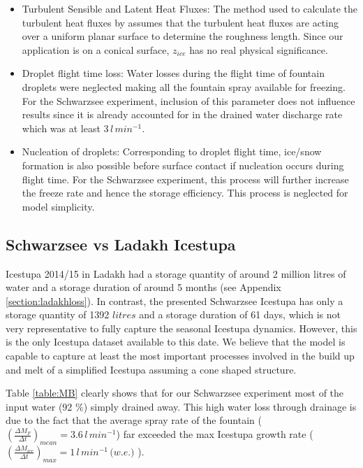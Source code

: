 \documentclass[utf8]{frontiersSCNS} %
\begin{document}
\begin{itemize}

\item  Turbulent Sensible and Latent Heat Fluxes: The method used to calculate the turbulent heat fluxes by
  \cite{Garratt_1992} assumes that the turbulent heat fluxes are acting over a uniform planar surface to determine the
  roughness length. Since our application is on a conical surface, $z_{ice}$ has no real physical significance.

\item Droplet flight time loss: Water losses during the flight time of fountain droplets were neglected making all the
  fountain spray available for freezing. For the Schwarzsee experiment, inclusion of this parameter does not influence
  results since it is already accounted for in the drained water discharge rate which was at least $3\, l\,min^{-1}$.

\item Nucleation of droplets: Corresponding to droplet flight time, ice/snow formation is also possible before surface
  contact if nucleation occurs during flight time. For the Schwarzsee experiment, this process will further increase the
  freeze rate and hence the storage efficiency. This process is neglected for model simplicity.

\end{itemize}

\subsection{Schwarzsee vs Ladakh Icestupa} Icestupa 2014/15 in Ladakh had a storage quantity of around 2 million litres
of water and a storage duration of around 5 months (see Appendix \ref{section:ladakhloss}). In contrast, the presented
Schwarzsee Icestupa has only a storage quantity of 1392 $litres$ and a storage duration of 61 days, which is not very
representative to fully capture the seasonal Icestupa dynamics. However, this is the only Icestupa dataset available to
this date. We believe that the model is capable to capture at least the most important processes involved in the build
up and melt of a simplified Icestupa assuming a cone shaped structure.

Table \ref{table:MB} clearly shows that for our Schwarzsee experiment most of the input water (92 \%) simply drained
away. This high water loss through drainage is due to the fact that the average spray rate of the fountain
($(\frac{\Delta M_{F}}{\Delta t})_{mean} = 3.6\, l\,min^{-1}$) far exceeded the max Icestupa growth rate ($(\frac{\Delta
M_{ice}}{\Delta t})_{max} = 1\, l\,min^{-1}\, \textit{(w.e.)}$ ).
\end{document}
